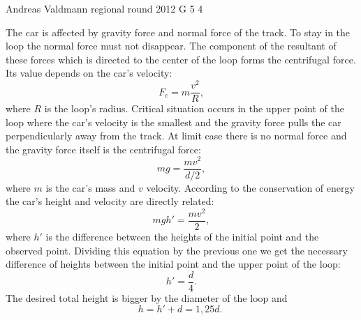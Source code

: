 \documentclass[11pt]{article}
\begin{document}
{Andreas Valdmann} %
{regional round} %
{2012} %
{G 5} %
{4} %
{

\ifEngSolution
The car is affected by gravity force and normal force of the track. To stay in the loop the normal force must not disappear. The component of the resultant of these forces which is directed to the center of the loop forms the centrifugal force. Its value depends on the car’s velocity:
\[F_c=m\frac{v^2}{R},\] 
where $R$ is the loop’s radius. Critical situation occurs in the upper point of the loop where the car’s velocity is the smallest and the gravity force pulls the car perpendicularly away from the track. At limit case there is no normal force and the gravity force itself is the centrifugal force:
\[ mg=\frac{mv^2}{d/2},\] 
where $m$ is the car’s mass and $v$ velocity. According to the conservation of energy the car’s height and velocity are directly related:
\[ mgh'=\frac{mv^2}{2},\]
where $h'$ is the difference between the heights of the initial point and the observed point. Dividing this equation by the previous one we get the necessary difference of heights between the initial point and the upper point of the loop:
\[ h'=\frac{d}{4}.\]
The desired total height is bigger by the diameter of the loop and
\[ h=h'+d=1,25d.\;\]
\fi
}
\end{document}
